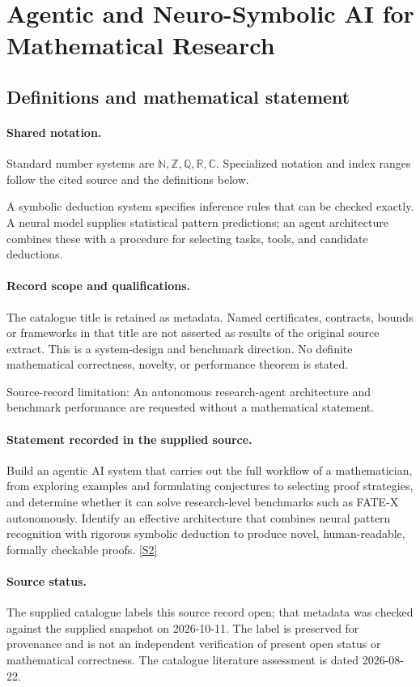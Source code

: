\documentclass[11pt]{article}
\newcommand{\sref}[2]{\hyperlink{source:#1:#2}{[S#2]}}
\begin{document}
\section{Agentic and Neuro-Symbolic AI for Mathematical Research}\label{statement}

\subsection{Definitions and mathematical statement}

\paragraph{Shared notation.}Standard number systems are $\mathbb N,\mathbb Z,\mathbb Q,\mathbb R,\mathbb C$. Specialized notation and index ranges follow the cited source and the definitions below.


A symbolic deduction system specifies inference rules that can be checked exactly. A neural model supplies statistical pattern predictions; an agent architecture combines these with a procedure for selecting tasks, tools, and candidate deductions.
\paragraph{Record scope and qualifications.}
The catalogue title is retained as metadata. Named certificates, contracts, bounds or frameworks in that title are not asserted as results of the original source extract.
This is a system-design and benchmark direction. No definite mathematical correctness, novelty, or performance theorem is stated.

Source-record limitation: An autonomous research-agent architecture and benchmark performance are requested without a mathematical statement.
\paragraph{Statement recorded in the supplied source.}
Build an agentic AI system that carries out the full workflow of a mathematician, from exploring examples and formulating conjectures to selecting proof strategies, and determine whether it can solve research-level benchmarks such as FATE-X autonomously. Identify an effective architecture that combines neural pattern recognition with rigorous symbolic deduction to produce novel, human-readable, formally checkable proofs. \sref{statement}{2}
\paragraph{Source status.}
The supplied catalogue labels this source record open; that metadata was checked against the supplied snapshot on 2026-10-11. The label is preserved for provenance and is not an independent verification of present open status or mathematical correctness. The catalogue literature assessment is dated 2026-08-22.
\end{document}
